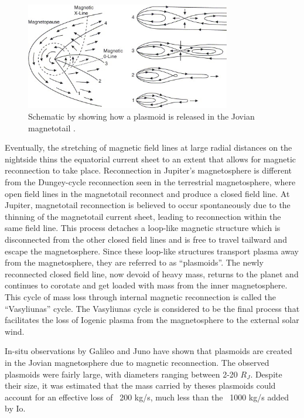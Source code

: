 \begin{figure}
    \centering
    \includegraphics[width=0.8\textwidth]{images1/chp1-vasyliunas-cycle.jpg}
    \caption{Schematic by \protect{} showing how a plasmoid is released in the Jovian magnetotail \protect\cite{Russell2005InteractionEnvironments}.}
    \label{fig:vasyliunas-cycle}
\end{figure}

Eventually, the stretching of magnetic field lines at large radial distances on the nightside thins the equatorial current sheet to an extent that allows for magnetic reconnection to take place. Reconnection in Jupiter's magnetosphere is different from the Dungey-cycle reconnection seen in the terrestrial magnetosphere, where open field lines in the magnetotail reconnect and produce a closed field line. At Jupiter, magnetotail reconnection is believed to occur spontaneously due to the thinning of the magnetotail current sheet, leading to reconnection within the same field line. This process detaches a loop-like magnetic structure which is disconnected from the other closed field lines and is free to travel tailward and escape the magnetosphere. Since these loop-like structures transport plasma away from the magnetosphere, they are referred to as ``plasmoids''. The newly reconnected closed field line, now devoid of heavy mass, returns to the planet and continues to corotate and get loaded with mass from the inner magnetosphere. This cycle of mass loss through internal magnetic reconnection is called the ``Vasyliunas'' cycle. The Vasyliunas cycle is considered to be the final process that facilitates the loss of Iogenic plasma from the magnetosphere to the external solar wind.

In-situ observations by Galileo and Juno have shown that plasmoids are created in the Jovian magnetosphere due to magnetic reconnection. The observed plasmoids were fairly large, with diameters ranging between 2-20 $R_J$. Despite their size, it was estimated that the mass carried by theses plasmoids could account for an effective loss of ~200 kg/s, much less than the ~1000 kg/s added by Io. 


